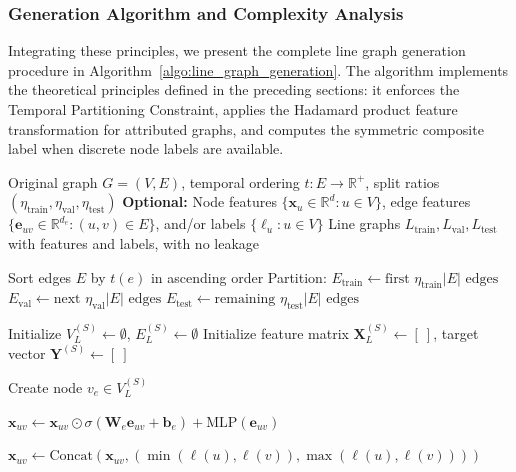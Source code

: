 \documentclass[pdflatex,sn-mathphys-num]{sn-jnl}%
\theoremstyle{thmstyleone}%
\theoremstyle{thmstyletwo}%
\theoremstyle{thmstylethree}%
\theoremstyle{plain} %
\theoremstyle{definition} %
\theoremstyle{remark} %
\theoremstyle{plain} %
\begin{document}
\subsubsection{Generation Algorithm and Complexity Analysis}
\label{subsec:algorithm_complexity}

Integrating these principles, we present the complete line graph generation procedure in Algorithm~\ref{algo:line_graph_generation}. The algorithm implements the theoretical principles defined in the preceding sections: it enforces the Temporal Partitioning Constraint, applies the Hadamard product feature transformation  for attributed graphs, and computes the symmetric composite label when discrete node labels are available.

\begin{algorithm}[H]
\caption{Line Graph Generation }
\label{algo:line_graph_generation}
\begin{algorithmic}[1]
\Require Original graph $G = (V, E)$, temporal ordering $t: E \to \mathbb{R}^+$, split ratios $(\eta_{\text{train}}, \eta_{\text{val}}, \eta_{\text{test}})$
\Require \textbf{Optional:} Node features $\{\mathbf{x}_u \in \mathbb{R}^d : u \in V\}$, edge features $\{\mathbf{e}_{uv} \in \mathbb{R}^{d_e} : (u,v) \in E\}$, and/or labels $\{\ell_u : u \in V\}$
\Ensure Line graphs $L_{\text{train}}, L_{\text{val}}, L_{\text{test}}$ with features and labels, with no leakage

\State Sort edges $E$ by $t(e)$ in ascending order
\State Partition: $E_{\text{train}} \gets \text{first } \eta_{\text{train}}|E| \text{ edges}$
\State $E_{\text{val}} \gets \text{next } \eta_{\text{val}}|E| \text{ edges}$
\State $E_{\text{test}} \gets \text{remaining } \eta_{\text{test}}|E| \text{ edges}$

    \State Initialize $V_L^{(S)} \gets \emptyset$, $E_L^{(S)} \gets \emptyset$
    \State Initialize feature matrix $\mathbf{X}_L^{(S)} \gets [\ ]$, target vector $\mathbf{Y}^{(S)} \gets [\ ]$
    
        \State Create node $v_e \in V_L^{(S)}$

            \State $\mathbf{x}_{uv} \gets \mathbf{x}_{uv} \odot \sigma(\mathbf{W}_e \mathbf{e}_{uv} + \mathbf{b}_e) + \text{MLP}(\mathbf{e}_{uv})$ 
      
            \State $\mathbf{x}_{uv} \gets \text{Concat}(\mathbf{x}_{uv}, (\min(\ell(u),\ell(v)), \max(\ell(u),\ell(v))))$ 
        \EndIf
        

\end{algorithmic}
\end{algorithm}
\end{document}
